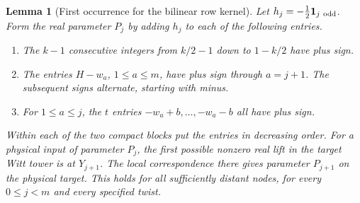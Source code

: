 \documentclass[a4paper,11pt]{article}
\newtheorem{lemma}[proposition]{Lemma}
\theoremstyle{definition}
\theoremstyle{remark}
\numberwithin{equation}{section}
\begin{document}
\begin{lemma}[First occurrence for the bilinear row kernel]
\leavevmode\label{lem:rowreal809}
Let \(h_j=-\tfrac12{\bf1}_{j\ {\rm odd}}\). Form the real parameter
\(P_j\) by adding \(h_j\) to each of the following entries.
\begin{enumerate}
\item The \(k-1\) consecutive integers from \(k/2-1\) down to
\(1-k/2\) have plus sign.
\item The entries \(H-w_a\), \(1\leq a\leq m\), have plus sign
through \(a=j+1\). The subsequent signs alternate, starting with minus.
\item For \(1\leq a\leq j\), the \(t\) entries
\(-w_a+b,\ldots,-w_a-b\) all have plus sign.
\end{enumerate}
Within each of the two compact blocks put the entries in decreasing
order. For a physical input of parameter \(P_j\), the first possible
nonzero real lift in the target Witt tower is at \(Y_{j+1}\).
The local correspondence there gives parameter \(P_{j+1}\) on the
physical target. This holds for all sufficiently distant nodes, for
every \(0\leq j<m\) and every specified twist.
\end{lemma}
\end{document}
